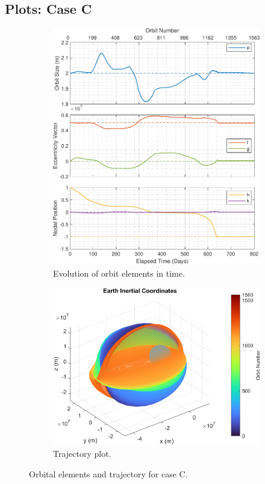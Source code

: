 \subsection{Plots: Case C}
\begin{figure}[H]
  \centering
  \begin{subfigure}[t]{0.4\textwidth}
    \includegraphics[width=\textwidth]{figures/plane_change/orbital_elements.pdf}
    \caption{Evolution of orbit elements in time.}
    \label{fig:results_c_a}
  \end{subfigure}
  \begin{subfigure}[t]{0.59\textwidth}
    \includegraphics[width=\textwidth]{figures/plane_change/trajectory_plot.png}
    \caption{Trajectory plot.}
    \label{fig:results_c_b}
  \end{subfigure}
  \caption{Orbital elements and trajectory for case C.}
  \label{fig:results_c}
\end{figure}

